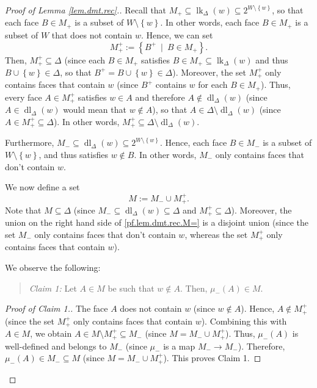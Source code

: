 \documentclass[12pt]{amsart}
\theoremstyle{definition}
\newenvironment{statement}{\begin{quote}}{\end{quote}}
\DeclareMathOperator{\lk}{lk}
\DeclareMathOperator{\dl}{dl}
\begin{document}
\begin{proof}[Proof of Lemma \ref{lem.dmt.rec}.]
Recall that $M_+\subseteq\lk_{\Delta}\left(
w\right)  \subseteq 2^{W\setminus\left\{  w\right\}  }$, so that each face
$B\in M_+$ is a subset of $W\setminus\left\{  w\right\}  $. In other words,
each face $B\in M_+$ is a subset of $W$ that does not contain $w$. Hence, we
can set%
\[
M_+^+:=\left\{  B^+\ \mid\ B\in M_+\right\}  .
\]
Then, $M_+^+\subseteq\Delta$ (since each $B\in M_+$ satisfies $B\in
M_+\subseteq\lk_{\Delta}\left(  w\right)  $ and thus
$B\cup\left\{  w\right\}  \in\Delta$, so that $B^+=B\cup\left\{  w\right\}
\in\Delta$). Moreover, the set $M_+^+$ only contains faces that contain
$w$ (since $B^+$ contains $w$ for each $B\in M_+$). Thus, every face $A\in
M_+^+$ satisfies $w\in A$ and therefore
$A\notin \dl_{\Delta}\left(  w\right)  $ (since
$A\in\dl_{\Delta}\left(  w\right)  $ would mean that $w\notin A$), so that
$A\in\Delta\setminus\dl_{\Delta}\left(  w\right)  $
(since $A\in M_+^+\subseteq\Delta$). In other words, $M_+^+%
\subseteq\Delta\setminus\dl_{\Delta}\left(  w\right)
$.

Furthermore, $M_-\subseteq\dl_{\Delta}\left(
w\right)  \subseteq2^{W\setminus\left\{  w\right\}  }$. Hence, each face $B\in
M_-$ is a subset of $W\setminus\left\{  w\right\}  $, and thus satisfies
$w\notin B$. In other words, $M_-$ only contains faces that don't contain
$w$.

We now define a set
\begin{equation}
M:=M_-\cup M_+^+. \label{pf.lem.dmt.rec.M=}%
\end{equation}
Note that $M\subseteq\Delta$ (since
$M_-\subseteq\dl_{\Delta}\left(  w\right)  \subseteq\Delta$ and
$M_+^+ \subseteq\Delta$). Moreover, the union on the right hand side of
\eqref{pf.lem.dmt.rec.M=} is a disjoint union (since the set $M_-$ only
contains faces that don't contain $w$, whereas the set $M_+^+$ only
contains faces that contain $w$).

We observe the following:

\begin{statement}
\textit{Claim 1:} Let $A\in M$ be such that $w\notin A$. Then, $\mu_-\left(
A\right)  \in M$.
\end{statement}

\begin{proof}
[Proof of Claim 1.]The face $A$ does not contain $w$ (since $w\notin A$).
Hence, $A\notin M_+^+$ (since the set $M_+^+$ only contains faces that
contain $w$). Combining this with $A\in M$, we obtain $A\in M\setminus
M_+^+\subseteq M_-$ (since $M=M_-\cup M_+^+$). Thus, $\mu
_-\left(  A\right)  $ is well-defined and belongs to $M_-$ (since $\mu
_-$ is a map $M_-\rightarrow M_-$). Therefore, $\mu_-\left(  A\right)
\in M_-\subseteq M$ (since $M=M_-\cup M_+^+$). This proves Claim 1.
\end{proof}


\end{proof}
\end{document}
